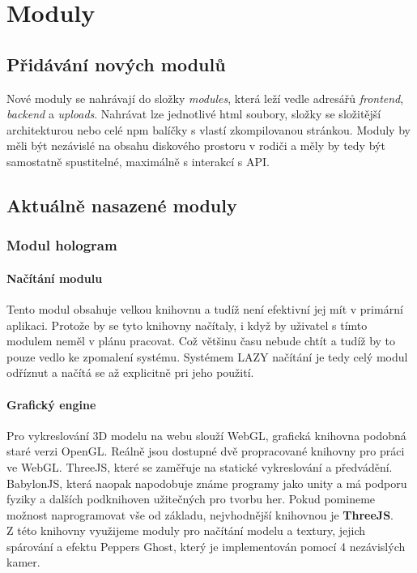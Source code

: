 \chapter{Moduly}

\section{Přidávání nových modulů}
Nové moduly se nahrávají do složky \textit{modules},
která leží vedle adresářů \textit{frontend}, \textit{backend} a \textit{uploads}.
Nahrávat lze jednotlivé html soubory, složky se složitější architekturou nebo
celé npm balíčky s vlastí zkompilovanou stránkou. Moduly by měli být nezávislé na
obsahu diskového prostoru v rodiči a měly by tedy být samostatně spustitelné,
maximálně s interakcí s API.

\section{Aktuálně nasazené moduly}

\subsection{Modul hologram}

\subsubsection{Načítání modulu}
Tento modul obsahuje velkou knihovnu a tudíž není efektivní jej mít v primární aplikaci.
Protože by se tyto knihovny načítaly, i když by uživatel s tímto modulem neměl v plánu pracovat.
Což většinu času nebude chtít a tudíž by to pouze vedlo ke zpomalení systému.
Systémem LAZY načítání je tedy celý modul odříznut a načítá se až explicitně pri jeho použití.

\subsubsection{Grafický engine}
Pro vykreslování 3D modelu na webu slouží WebGL, grafická knihovna podobná staré verzi OpenGL.
Reálně jsou dostupné dvě propracované knihovny pro práci ve WebGL.
ThreeJS, které se zaměřuje na statické vykreslování a předvádění.
BabylonJS, která naopak napodobuje známe programy jako unity a má podporu
fyziky a dalších podknihoven užitečných pro tvorbu her.
Pokud pomineme možnost naprogramovat vše od základu, nejvhodnější knihovnou 
je \textbf{ThreeJS}.\\
Z této knihovny využijeme moduly pro načítání modelu a textury, jejich spárování a
efektu Peppers Ghost, který je implementován pomocí 4 nezávislých kamer.


